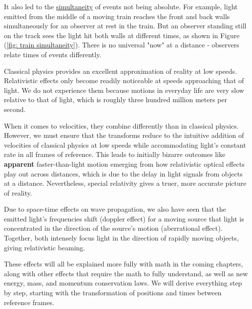 It also led to the \hyperlink{def-simultaneity}{simultaneity} of events not being absolute.
For example, light emitted from the middle of a moving train reaches the front and back walls simultaneously for an observer at rest in the train.
But an observer standing still on the track sees the light hit both walls at different times, as shown in Figure (\ref{fig: train simultaneity}).
There is no universal "now" at a distance - observers relate times of events differently.

Classical physics provides an excellent approximation of reality at low speeds.
Relativistic effects only become readily noticeable at speeds approaching that of light.
We do not experience them because motions in everyday life are very slow relative to that of light, which is roughly three hundred million meters per second.

When it comes to velocities, they combine differently than in classical physics.
However, we must ensure that the transforms reduce to the intuitive addition of velocities of classical physics at low speeds while accommodating light's constant rate in all frames of reference.
This leads to initially bizarre outcomes like \textbf{apparent} faster-than-light motion emerging from how relativistic optical effects play out across distances, which is due to the delay in light signals from objects at a distance.
Nevertheless, special relativity gives a truer, more accurate picture of reality.

Due to space-time effects on wave propagation, we also have seen that the emitted light's frequencies shift (doppler effect) for a moving source that light is concentrated in the direction of the source's motion (aberrational effect).
Together, both intensely focus light in the direction of rapidly moving objects, giving relativistic beaming.

These effects will all be explained more fully with math in the coming chapters, along with other effects that require the math to fully understand, as well as new energy, mass, and momentum conservation laws.
We will derive everything step by step, starting with the transformation of positions and times between reference frames.





